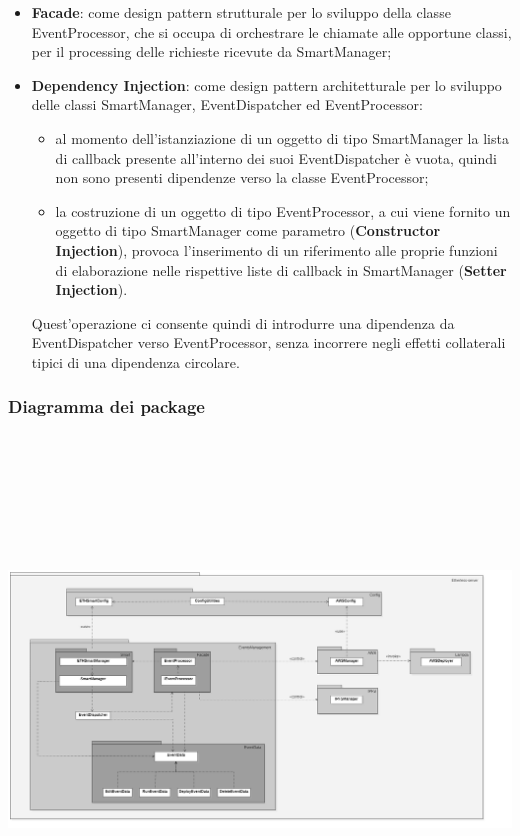 \begin{itemize}
	\item \textbf{Facade}: come design pattern strutturale per lo sviluppo della classe EventProcessor, che si occupa di orchestrare le chiamate alle opportune classi, per il processing delle richieste ricevute da SmartManager;
	\item \textbf{Dependency Injection}: come design pattern architetturale per lo sviluppo delle classi SmartManager, EventDispatcher ed EventProcessor:
	\begin{itemize}
		\item al momento dell'istanziazione di un oggetto di tipo SmartManager la lista di callback presente all'interno dei suoi EventDispatcher è vuota, quindi non sono presenti dipendenze verso la classe EventProcessor;
		\item la costruzione di un oggetto di tipo EventProcessor, a cui viene fornito un oggetto di tipo SmartManager come parametro (\textbf{Constructor Injection}), provoca l'inserimento di un riferimento alle proprie funzioni di elaborazione nelle rispettive liste di callback in SmartManager (\textbf{Setter Injection}).
	\end{itemize}
	Quest'operazione ci consente quindi di introdurre una dipendenza da EventDispatcher verso EventProcessor, senza incorrere negli effetti collaterali tipici di una dipendenza circolare.
\end{itemize}
\begin{landscape}
\subsubsection{Diagramma dei package}
	\includegraphics[width=24cm, height=14cm]{././diagrammi/etherless-server/Etherless-server-package.png}
\end{landscape}
